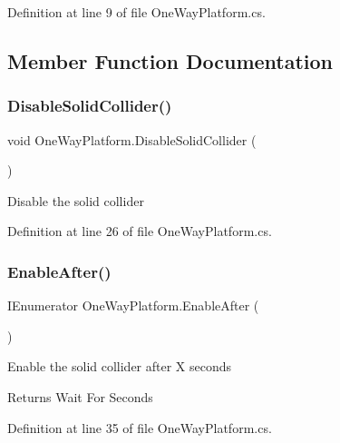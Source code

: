 Definition at line 9 of file One\+Way\+Platform.\+cs.



\subsection{Member Function Documentation}
\mbox{\label{class_one_way_platform_a1b8029968caa73f149a312d1113d1176}} 
\subsubsection{\texorpdfstring{Disable\+Solid\+Collider()}{DisableSolidCollider()}}
{\footnotesize\ttfamily void One\+Way\+Platform.\+Disable\+Solid\+Collider (\begin{DoxyParamCaption}{ }\end{DoxyParamCaption})}



Disable the solid collider 



Definition at line 26 of file One\+Way\+Platform.\+cs.

\mbox{\label{class_one_way_platform_aa1651ae509037fd1bb7e0bf567f36c60}} 
\subsubsection{\texorpdfstring{Enable\+After()}{EnableAfter()}}
{\footnotesize\ttfamily I\+Enumerator One\+Way\+Platform.\+Enable\+After (\begin{DoxyParamCaption}{ }\end{DoxyParamCaption})}



Enable the solid collider after X seconds 

\begin{DoxyReturn}{Returns}
Wait For Seconds
\end{DoxyReturn}


Definition at line 35 of file One\+Way\+Platform.\+cs.

